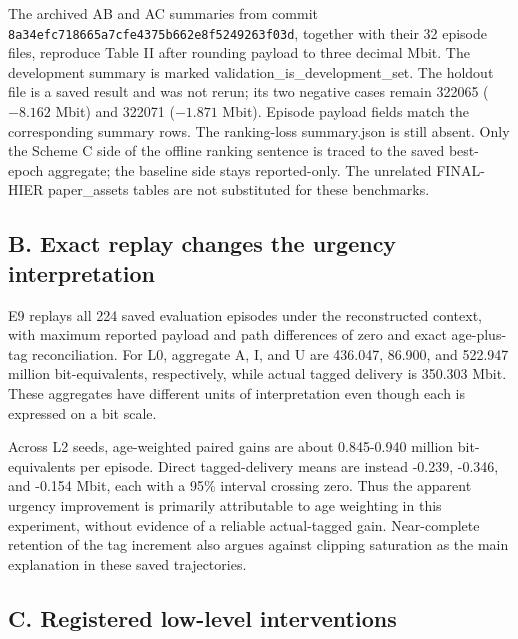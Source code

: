 The archived AB and AC summaries from commit \nolinkurl{8a34efc718665a7cfe4375b662e8f5249263f03d}, together with their 32 episode files, reproduce Table II after rounding payload to three decimal Mbit. The development summary is marked validation\_is\_development\_set. The holdout file is a saved result and was not rerun; its two negative cases remain 322065 ($-8.162$ Mbit) and 322071 ($-1.871$ Mbit). Episode payload fields match the corresponding summary rows. The ranking-loss summary.json is still absent. Only the Scheme C side of the offline ranking sentence is traced to the saved best-epoch aggregate; the baseline side stays reported-only. The unrelated FINAL-HIER paper\_assets tables are not substituted for these benchmarks.

\subsection*{B. Exact replay changes the urgency interpretation}

E9 replays all 224 saved evaluation episodes under the reconstructed context, with maximum reported payload and path differences of zero and exact age-plus-tag reconciliation. For L0, aggregate A, I, and U are 436.047, 86.900, and 522.947 million bit-equivalents, respectively, while actual tagged delivery is 350.303 Mbit. These aggregates have different units of interpretation even though each is expressed on a bit scale.

Across L2 seeds, age-weighted paired gains are about 0.845-0.940 million bit-equivalents per episode. Direct tagged-delivery means are instead -0.239, -0.346, and -0.154 Mbit, each with a 95\% interval crossing zero. Thus the apparent urgency improvement is primarily attributable to age weighting in this experiment, without evidence of a reliable actual-tagged gain. Near-complete retention of the tag increment also argues against clipping saturation as the main explanation in these saved trajectories.

\subsection*{C. Registered low-level interventions}

